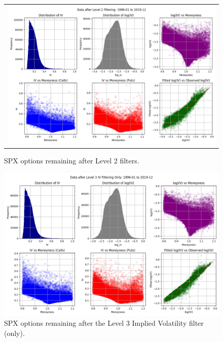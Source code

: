 \documentclass[11pt]{article}
\begin{document}
\begin{figure}[H]
  \centering
  \begin{tabular}{@{}c@{}}
    \includegraphics[width=\linewidth,height=0.666\linewidth]{../docs_src/L2_1996-01_2019-12_iv.png}
  \end{tabular}
  \caption{SPX options remaining after Level 2 filters.}
  \label{fig:l2_spx_options_data}
\end{figure}


\begin{figure}[H]
  \centering
  \includegraphics[width=\linewidth,height=0.666\linewidth]{../docs_src/L3_IV_1996-01_2019-12_iv.png}
  \caption{SPX options remaining after the Level 3 Implied Volatility filter (only).}
  \label{fig:l3_iv_only_spx_options_data}
\end{figure}
\end{document}
